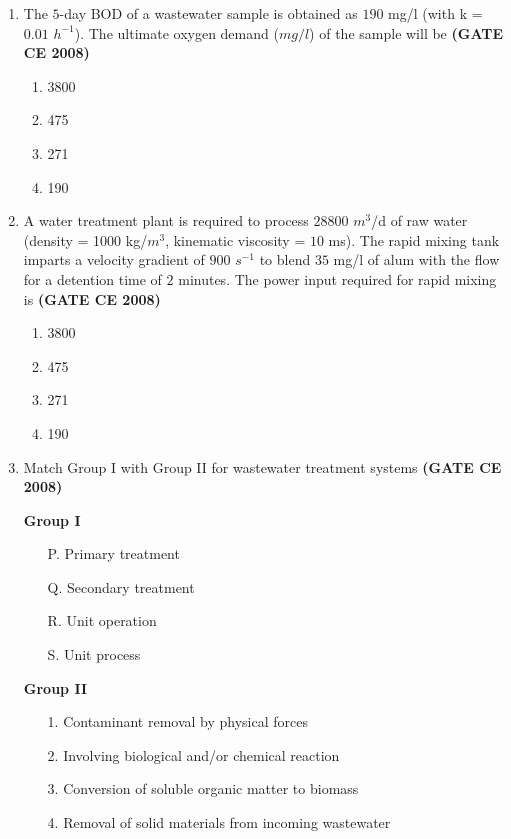 \documentclass[journal]{IEEEtran}
\begin{document}
\begin{enumerate}
\item The $5$-day BOD of a wastewater sample is obtained as $190$ mg/l (with k = $0.01$  $h^{-1}$). The ultimate oxygen demand ($mg/l$) of the sample will be \textbf{(GATE CE 2008)}

\begin{enumerate}
\item 3800
\item 475
\item 271
\item 190
\end{enumerate}  

\item A water treatment plant is required to process $28800$ $m^{3}$/d of raw water (density = 1000 kg/$m^{3}$, kinematic viscosity = $10$ ms). The rapid mixing tank imparts a velocity gradient of $900$ $s^{-1}$ to blend $35$ mg/l of alum with the flow for a detention time of $2$ minutes. The power input  required for rapid mixing is \textbf{(GATE CE 2008)}

\begin{enumerate}
\item 3800
\item 475
\item 271
\item 190
\end{enumerate}  

\item {Match Group I  with Group II  for wastewater treatment systems} \textbf{(GATE CE 2008)}

\begin{minipage}[t]{0.45\textwidth}
\textbf{Group I}
\begin{itemize}[align=left]
    \item[P.] Primary treatment
    \item[Q.] Secondary treatment
    \item[R.] Unit operation
    \item[S.] Unit process
\end{itemize}
\end{minipage}
\hfill
\begin{minipage}[t]{0.45\textwidth}
\textbf{Group II}
\begin{itemize}[align=left]
    \item[1.] Contaminant removal by physical forces
    \item[2.] Involving biological and/or chemical reaction
    \item[3.] Conversion of soluble organic matter to biomass
    \item[4.] Removal of solid materials from incoming wastewater
\end{itemize}
\end{minipage}



\end{enumerate}
\end{document}
